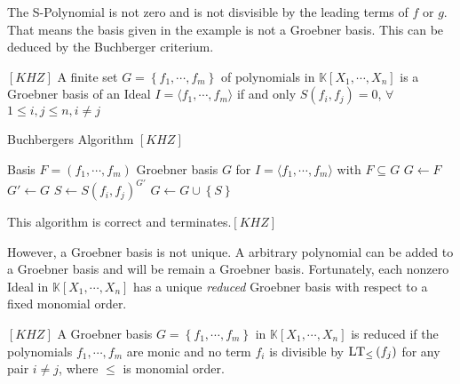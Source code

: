 The S-Polynomial is not zero and is not disvisible by the leading terms of $f$ or $g$. That means the basis given in the example is not a Groebner basis. This can be deduced by the Buchberger criterium.

\begin{env_definition}
$\left[ KHZ\right] $ A finite set $G = \left\lbrace f_{1}, \cdots , f_{m} \right\rbrace$ of polynomials in $ \mathbb{K}\left[X_{1}, \cdots, X_{n}\right] $ is a Groebner basis of an Ideal 
$I = \langle f_{1}, \cdots , f_{m} \rangle $ if and only $S\left( f_{i},f_{j}\right) = 0$, $ \forall$  $1 \leq i,j \leq n, i\neq j $

\end{env_definition}

\begin{algorithm}
\caption{Buchbergers Algorithm $[KHZ]$}
\label{alg:buchberger}
\begin{algorithmic}[1]
\Require Basis $F = \left( f_{1}, \cdots, f_{m} \right)  $
\Ensure Groebner basis $G$ for $I = \langle f_{1}, \cdots, f_{m} \rangle $ with $ F \subseteq G $
\State $G \gets F$
\Repeat
\State $G'\gets G $
\State $S \gets S\left( f_{i},f_{j} \right)^{G'}  $ 
\State $G \gets G \cup \left\lbrace S\right\rbrace $
\EndIf
\EndFor
{}

\end{algorithmic}
\end{algorithm}

This algorithm is correct and terminates.$\left[ KHZ\right]  $

\newpage

However, a Groebner basis is not unique. A arbitrary polynomial can be added to a Groebner basis and will be remain a Groebner basis.
Fortunately, each nonzero Ideal in $\mathbb{K}\left[X_{1}, \cdots, X_{n}\right]$ has a unique \textit{reduced} Groebner basis with respect to a fixed monomial order.

\begin{env_definition}
$[KHZ]$
A Groebner basis  $G= \left\lbrace  f_{1}, \cdots , f_{m} \right\rbrace  $ in 
$ \mathbb{K}\left[X_{1}, \cdots, X_{n}\right] $ is reduced if the polynomials $f_{1},\cdots , f_{m} $ are monic and no term $f_{i}$ is divisible by $ \textsc{LT}_{\leq }\left( f_{j}\right)$ for any pair $i\neq j$, where $\leq$ is monomial order.
\end{env_definition}


